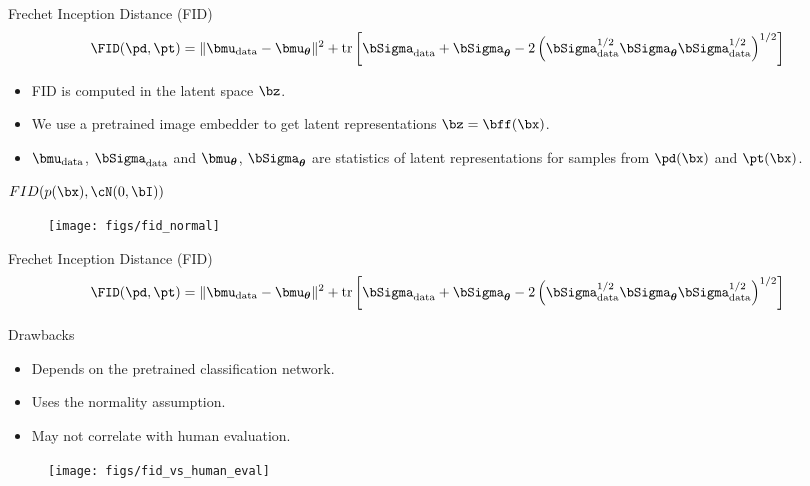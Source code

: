 \documentclass{beamer}
\begin{document}
\begin{frame}{Frechet Inception Distance (FID)}
	\vspace{-0.3cm}
	\[
		\FID (\pd, \pt) = \| \bmu_{\text{data}} - \bmu_{\boldsymbol{\theta}}\|^2 + \text{tr} \left[ \bSigma_{\text{data}} + \bSigma_{\boldsymbol{\theta}} - 2 \left(\bSigma_{\text{data}}^{1/2} \bSigma_{\boldsymbol{\theta}} \bSigma_{\text{data}}^{1/2} \right)^{1/2} \right]
	\]
	\vspace{-0.5cm}
	\begin{itemize}
		\item FID is computed in the latent space $\bz$.
		\item We use a pretrained image embedder to get latent representations $\bz = \bff(\bx)$.
		\item $\bmu_{\text{data}}$, $\bSigma_{\text{data}}$ and $\bmu_{\boldsymbol{\theta}}$, $\bSigma_{\boldsymbol{\theta}}$ are statistics of latent representations for samples from $\pd(\bx)$ and $\pt(\bx)$.
	\end{itemize}
	\eqpause
	\begin{block}{$FID(p(\bx), \cN(0, \bI))$}
		\begin{figure}
			\texttt{[image: figs/fid\_normal]}
		\end{figure}
	\end{block}
\end{frame}
\begin{frame}{Frechet Inception Distance (FID)}
	\vspace{-0.4cm}
	\[
		\FID (\pd, \pt) = \| \bmu_{\text{data}} - \bmu_{\boldsymbol{\theta}}\|^2 + \text{tr} \left[ \bSigma_{\text{data}} + \bSigma_{\boldsymbol{\theta}} - 2 \left(\bSigma_{\text{data}}^{1/2} \bSigma_{\boldsymbol{\theta}} \bSigma_{\text{data}}^{1/2} \right)^{1/2} \right]
	\]
	\eqpause
	\vspace{-0.3cm}
	\begin{block}{Drawbacks}
		\begin{itemize}
			\item Depends on the pretrained classification network.
			\item Uses the normality assumption.
			\item May not correlate with human evaluation.
		\end{itemize}
	\end{block}
	\eqpause
	\begin{figure}
		\texttt{[image: figs/fid\_vs\_human\_eval]}
	\end{figure}
\end{frame}
\end{document}
